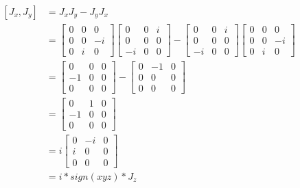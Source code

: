 \documentclass[10pt]{ucthesis}
\begin{document}
\begin{equation}
	\begin{aligned}
		[J_x,J_y] &= J_xJ_y - J_yJ_x \\
					&= \begin{bmatrix}
							0 & 0 & 0\\
							0 & 0 & -i\\
							0 & i & 0
						\end{bmatrix}
						 \begin{bmatrix}
							0 & 0 & i\\
							0 & 0 & 0\\
							-i & 0 & 0
						\end{bmatrix}
						-
						\begin{bmatrix}
							0 & 0 & i\\
							0 & 0 & 0\\
							-i & 0 & 0
						\end{bmatrix}
						 \begin{bmatrix}
							0 & 0 & 0\\
							0 & 0 & -i\\
							0 & i & 0
						\end{bmatrix}\\
					&=  \begin{bmatrix}
							0 & 0 & 0\\
							-1 & 0 & 0\\
							0 & 0 & 0
						\end{bmatrix}
						-
						 \begin{bmatrix}
							0 & -1 & 0\\
							0 & 0 & 0\\
							0 & 0 & 0
						\end{bmatrix} \\
					&= \begin{bmatrix}
							0 & 1 & 0\\
							-1 & 0 & 0\\
							0 & 0 & 0
						\end{bmatrix} \\
					&=i \begin{bmatrix}
							0 & -i & 0\\
							i & 0 & 0\\
							0 & 0 & 0
						\end{bmatrix} \\
					&= i*sign(xyz)*J_z\\
	\end{aligned}
\end{equation} 
\end{document}
